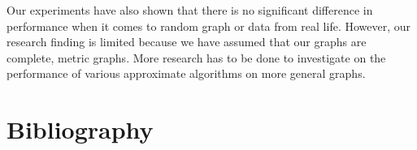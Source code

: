 \documentclass[paper=a4, fontsize=11pt]{scrartcl}	%
\numberwithin{equation}{section}		%
\numberwithin{figure}{section}			%
\numberwithin{table}{section}				%
\begin{document}
Our experiments have also shown that there is no significant difference in performance when it comes to random graph or data from real life. However, our research finding is limited because we have assumed that our graphs are complete, metric graphs. More research has to be done to investigate on the performance of various approximate algorithms on more general graphs. 
\section{Bibliography}

\nocite{*}

\end{document}
